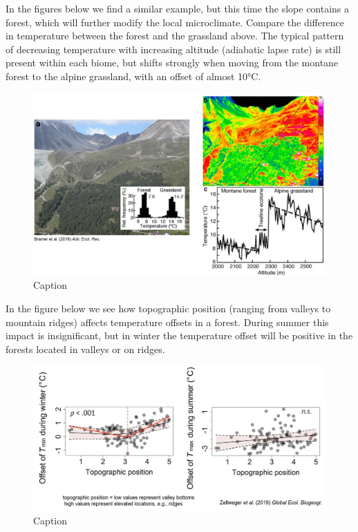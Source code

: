 \documentclass[12pt,oneside]{book}
\begin{document}
In the figures below we find a similar example, but this time the slope
contains a forest, which will further modify the local microclimate.
Compare the difference in temperature between the forest and the
grassland above. The typical pattern of decreasing temperature with
increasing altitude (adiabatic lapse rate) is still present within each
biome, but shifts strongly when moving from the montane forest to the
alpine grassland, with an offset of almost 10°C.

\begin{figure}

{\centering \includegraphics[width=1\linewidth]{figures/Figure1025} 

}

\caption{Caption}\label{fig:Micro25}
\end{figure}

In the figure below we see how topographic position (ranging from
valleys to mountain ridges) affects temperature offsets in a forest.
During summer this impact is insignificant, but in winter the
temperature offset will be positive in the forests located in valleys or
on ridges.

\begin{figure}

{\centering \includegraphics[width=1\linewidth]{figures/Figure1026} 

}

\caption{Caption}\label{fig:Micro26}
\end{figure}
\end{document}
